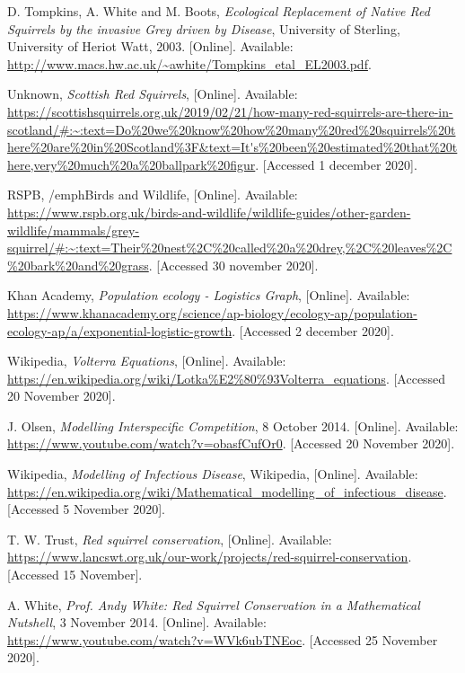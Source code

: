\documentclass{article}
\begin{document}
\begin{enumerate}[label={[\arabic*]}]

\item D. Tompkins, A. White and M. Boots, \emph{Ecological Replacement of Native Red Squirrels by the invasive Grey driven by Disease}, University of Sterling, University of Heriot Watt, 2003. [Online]. Available: \url{http://www.macs.hw.ac.uk/~awhite/Tompkins_etal_EL2003.pdf}.
\item Unknown, \emph{Scottish Red Squirrels}, [Online]. Available: \url{https://scottishsquirrels.org.uk/2019/02/21/how-many-red-squirrels-are-there-in-scotland/#:~:text=Do\%20we\%20know\%20how\%20many\%20red\%20squirrels\%20there\%20are\%20in\%20Scotland\%3F&text=It's\%20been\%20estimated\%20that\%20there,very\%20much\%20a\%20ballpark\%20figur}. [Accessed 1 december 2020].
\item RSPB, /emph{Birds and Wildlife}, [Online]. Available: \url{https://www.rspb.org.uk/birds-and-wildlife/wildlife-guides/other-garden-wildlife/mammals/grey-squirrel/#:~:text=Their\%20nest\%2C\%20called\%20a\%20drey,\%2C\%20leaves\%2C\%20bark\%20and\%20grass}. [Accessed 30 november 2020].
\item Khan Academy, \emph{Population ecology - Logistics Graph}, [Online]. Available: \url{https://www.khanacademy.org/science/ap-biology/ecology-ap/population-ecology-ap/a/exponential-logistic-growth}. [Accessed 2 december 2020].
\item Wikipedia, \emph{Volterra Equations}, [Online]. Available: \url{https://en.wikipedia.org/wiki/Lotka\%E2\%80\%93Volterra_equations}. [Accessed 20 November 2020].
\item J. Olsen, \emph{Modelling Interspecific Competition}, 8 October 2014. [Online]. Available: \url{https://www.youtube.com/watch?v=obasfCufOr0}. [Accessed 20 November 2020].
\item Wikipedia, \emph{Modelling of Infectious Disease}, Wikipedia, [Online]. Available: \url{https://en.wikipedia.org/wiki/Mathematical_modelling_of_infectious_disease}. [Accessed 5 November 2020].
\item T. W. Trust, \emph{Red squirrel conservation}, [Online]. Available: \url{https://www.lancswt.org.uk/our-work/projects/red-squirrel-conservation}. [Accessed 15 November].
\item A. White, \emph{Prof. Andy White: Red Squirrel Conservation in a Mathematical Nutshell}, 3 November 2014. [Online]. Available: \url{https://www.youtube.com/watch?v=WVk6ubTNEoc}. [Accessed 25 November 2020].

\end{enumerate}
\end{document}
